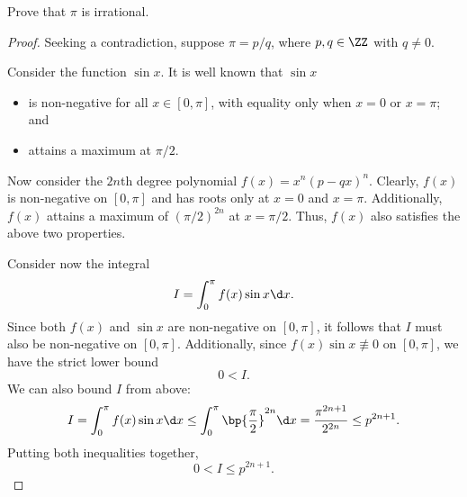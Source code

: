 \begin{problem}
    Prove that $\pi$ is irrational.
\end{problem}
\begin{proof}
    Seeking a contradiction, suppose $\pi = p/q$, where $p, q \in \ZZ$ with $q \neq 0$. 
    
    Consider the function $\sin x$. It is well known that $\sin x$
    \begin{itemize}
        \item is non-negative for all $x \in [0, \pi]$, with equality only when $x = 0$ or $x = \pi$; and
        \item attains a maximum at $\pi/2$.
    \end{itemize}

    Now consider the $2n$th degree polynomial $f(x) = x^n (p - qx)^n$. Clearly, $f(x)$ is non-negative on $[0, \pi]$ and has roots only at $x = 0$ and $x = \pi$. Additionally, $f(x)$ attains a maximum of $(\pi/2)^{2n}$ at $x = \pi/2$. Thus, $f(x)$ also satisfies the above two properties.
    
    Consider now the integral \[I = \int_0^\pi f(x) \sin x \d x.\] Since both $f(x)$ and $\sin x$ are non-negative on $[0, \pi]$, it follows that $I$ must also be non-negative on $[0, \pi]$. Additionally, since $f(x) \sin x \not\equiv 0$ on $[0, \pi]$, we have the strict lower bound \[0 < I.\] We can also bound $I$ from above: \[I = \int_0^\pi f(x) \sin x \d x \leq \int_0^\pi \bp{\frac\pi2}^{2n} \d x = \frac{\pi^{2n+1}}{2^{2n}} \leq p^{2n+1}.\] Putting both inequalities together, \[0 < I \leq p^{2n+1}. \tag{1}\]


\end{proof}
